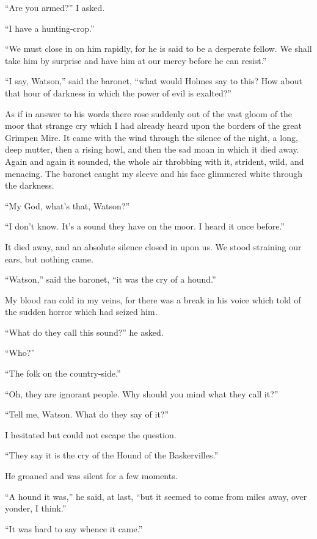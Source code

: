 \documentclass[paper=a5,BCOR=7mm,twoside,DIV=calc,12pt,usegeometry,openany,chapterprefix,endperiod,headings=big]{scrbook} %
\begin{document}
\enquote{Are you armed?} I asked.

\enquote{I have a hunting-crop.}

\enquote{We must close in on him rapidly, for he is said to be a desperate fellow. We shall take him by surprise and have him at our mercy before he can resist.}

\enquote{I say, Watson,} said the baronet, \enquote{what would Holmes say to this? How about that hour of darkness in which the power of evil is exalted?}

As if in answer to his words there rose suddenly out of the vast gloom of the moor that strange cry which I had already heard upon the borders of the great Grimpen Mire. It came with the wind through the silence of the night, a long, deep mutter, then a rising howl, and then the sad moan in which it died away. Again and again it sounded, the whole air throbbing with it, strident, wild, and menacing. The baronet caught my sleeve and his face glimmered white through the darkness.

\enquote{My God, what's that, Watson?}

\enquote{I don't know. It's a sound they have on the moor. I heard it once before.}

It died away, and an absolute silence closed in upon us. We stood straining our ears, but nothing came.

\enquote{Watson,} said the baronet, \enquote{it was the cry of a hound.}

My blood ran cold in my veins, for there was a break in his voice which told of the sudden horror which had seized him.

\enquote{What do they call this sound?} he asked.

\enquote{Who?}

\enquote{The folk on the country-side.}

\enquote{Oh, they are ignorant people. Why should you mind what they call it?}

\enquote{Tell me, Watson. What do they say of it?}

I hesitated but could not escape the question.

\enquote{They say it is the cry of the Hound of the Baskervilles.}

He groaned and was silent for a few moments.

\enquote{A hound it was,} he said, at last, \enquote{but it seemed to come from miles away, over yonder, I think.}

\enquote{It was hard to say whence it came.}
\end{document}
